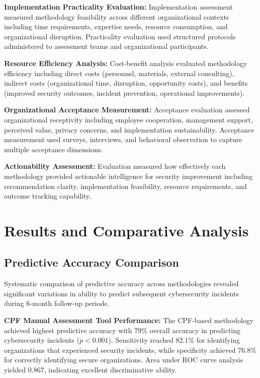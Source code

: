 \documentclass[10pt, twocolumn]{article}
\begin{document}
\textbf{Implementation Practicality Evaluation:} Implementation assessment measured methodology feasibility across different organizational contexts including time requirements, expertise needs, resource consumption, and organizational disruption. Practicality evaluation used structured protocols administered to assessment teams and organizational participants.

\textbf{Resource Efficiency Analysis:} Cost-benefit analysis evaluated methodology efficiency including direct costs (personnel, materials, external consulting), indirect costs (organizational time, disruption, opportunity costs), and benefits (improved security outcomes, incident prevention, operational improvements).

\textbf{Organizational Acceptance Measurement:} Acceptance evaluation assessed organizational receptivity including employee cooperation, management support, perceived value, privacy concerns, and implementation sustainability. Acceptance measurement used surveys, interviews, and behavioral observation to capture multiple acceptance dimensions.

\textbf{Actionability Assessment:} Evaluation measured how effectively each methodology provided actionable intelligence for security improvement including recommendation clarity, implementation feasibility, resource requirements, and outcome tracking capability.

\section{Results and Comparative Analysis}

\subsection{Predictive Accuracy Comparison}

Systematic comparison of predictive accuracy across methodologies revealed significant variations in ability to predict subsequent cybersecurity incidents during 6-month follow-up periods.

\textbf{CPF Manual Assessment Tool Performance:} The CPF-based methodology achieved highest predictive accuracy with 79\% overall accuracy in predicting cybersecurity incidents ($p < 0.001$). Sensitivity reached 82.1\% for identifying organizations that experienced security incidents, while specificity achieved 76.8\% for correctly identifying secure organizations. Area under ROC curve analysis yielded 0.867, indicating excellent discriminative ability.
\end{document}
